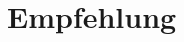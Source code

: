 \documentclass[
10pt, %
a4paper, %
BCOR15mm, %
DIV14, %
footsepline = false, %
headsepline, %
oneside,
openright,
parskip=half, %
abstracton, %
listof=totocnumbered, %
bibliography=totocnumbered %
]{scrreprt}
\begin{document}

\chapter{Empfehlung}\label{chapter:Empfehlung}



\cleardoublepage


\appendix



\begingroup
\let\clearpage\relax
\listoffigures
\endgroup

\renewcommand{\lstlistlistingname}{Listingverzeichnis}

\begingroup
\let\clearpage\relax
\lstlistoflistings
\endgroup

\cleardoublepage
\end{document}
